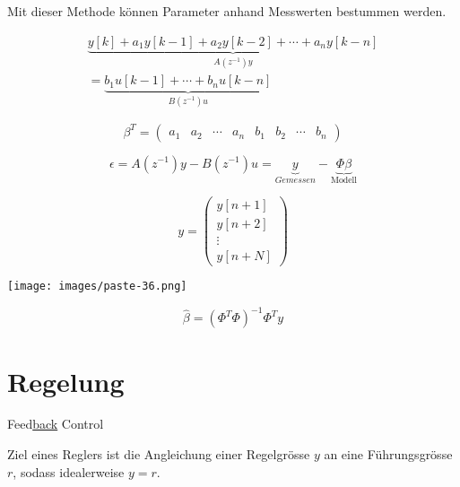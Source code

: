 \documentclass[
  10pt,
  a4paper,
  twocolumn]{article}
\numberwithin{equation}{section}
\begin{document}
Mit dieser Methode können Parameter anhand Messwerten bestummen werden.

\[
\begin{array}{r}
\underbrace{y[k]+a_1y[k-1]+a_2y[k-2]+\cdots+a_ny[k-n]}_{A(z^{-1})y}\\
= \underbrace{b_1u[k-1]+\cdots+b_nu[k-n]}_{B(z^{-1})u}
\end{array}
\]

\[
\beta^T=\begin{pmatrix}
a_1 & a_2 & \cdots & a_n & b_1 & b_2 & \cdots & b_n
\end{pmatrix}
\]

\[
\epsilon = A(z^{-1})y-B(z^{-1})u = \underbrace{y}_{Gemessen}-\underbrace{\Phi\beta}_{\text{Modell}}
\]

\[
y = \begin{pmatrix}
  y[n+1]\\
  y[n+2]\\
  \vdots\\
  y[n+N]
\end{pmatrix}
\]

\texttt{[image: images/paste-36.png]}

\[
\hat{\beta} = (\Phi^T\Phi)^{-1}\Phi^Ty
\]

\section{Regelung}\label{regelung}

Feed\ul{back} Control

Ziel eines Reglers ist die Angleichung einer Regelgrösse \(y\) an eine
Führungsgrösse \(r\), sodass idealerweise \(y=r\).
\end{document}
